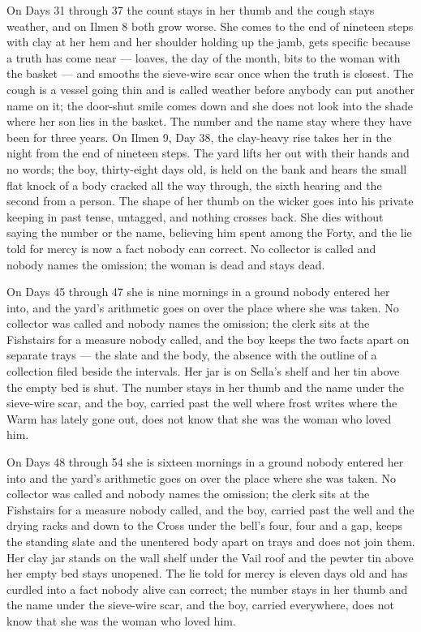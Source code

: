 \documentclass{design/chronicle}
\begin{document}
{On Days 31 through 37 the count stays in her thumb and the cough stays weather, and on Ilmen 8 both grow worse. She comes to the end of nineteen steps with clay at her hem and her shoulder holding up the jamb, gets specific because a truth has come near --- loaves, the day of the month, bits to the woman with the basket --- and smooths the sieve-wire scar once when the truth is closest. The cough is a vessel going thin and is called weather before anybody can put another name on it; the door-shut smile comes down and she does not look into the shade where her son lies in the basket. The number and the name stay where they have been for three years. On Ilmen 9, Day 38, the clay-heavy rise takes her in the night from the end of nineteen steps. The yard lifts her out with their hands and no words; the boy, thirty-eight days old, is held on the bank and hears the small flat knock of a body cracked all the way through, the sixth hearing and the second from a person. The shape of her thumb on the wicker goes into his private keeping in past tense, untagged, and nothing crosses back. She dies without saying the number or the name, believing him spent among the Forty, and the lie told for mercy is now a fact nobody can correct. No collector is called and nobody names the omission; the woman is dead and stays dead.

On Days 45 through 47 she is nine mornings in a ground nobody entered her into, and the yard’s arithmetic goes on over the place where she was taken. No collector was called and nobody names the omission; the clerk sits at the Fishstairs for a measure nobody called, and the boy keeps the two facts apart on separate trays --- the slate and the body, the absence with the outline of a collection filed beside the intervals. Her jar is on Sella’s shelf and her tin above the empty bed is shut. The number stays in her thumb and the name under the sieve-wire scar, and the boy, carried past the well where frost writes where the Warm has lately gone out, does not know that she was the woman who loved him.

On Days 48 through 54 she is sixteen mornings in a ground nobody entered her into and the yard’s arithmetic goes on over the place where she was taken. No collector was called and nobody names the omission; the clerk sits at the Fishstairs for a measure nobody called, and the boy, carried past the well and the drying racks and down to the Cross under the bell’s four, four and a gap, keeps the standing slate and the unentered body apart on trays and does not join them. Her clay jar stands on the wall shelf under the Vail roof and the pewter tin above her empty bed stays unopened. The lie told for mercy is eleven days old and has curdled into a fact nobody alive can correct; the number stays in her thumb and the name under the sieve-wire scar, and the boy, carried everywhere, does not know that she was the woman who loved him.

}
\end{document}
